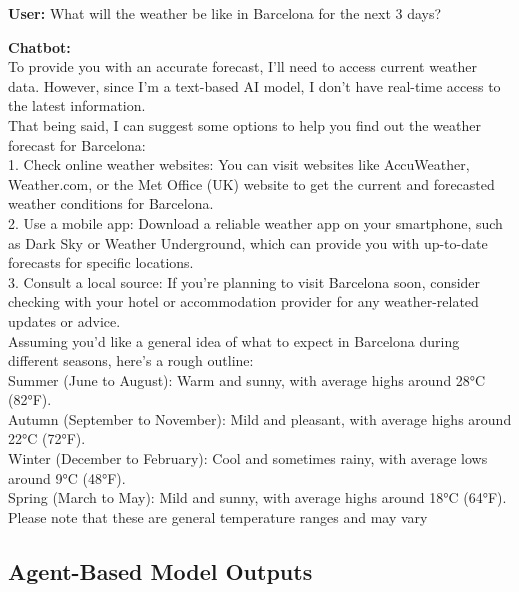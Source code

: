 \documentclass[fleqn,moreauthors,10pt]{ds_report}
\begin{document}
\begin{tcolorbox}[
    colback=gray!5,
    colframe=black!80,
    title=Prompt-Engineered Model Output - Weather,
    arc=2mm
]

\textbf{User:} What will the weather be like in Barcelona for the next 3 days?

\vspace{0.3cm}

\textbf{Chatbot:} \\
To provide you with an accurate forecast, I'll need to access current weather data. However, since I'm a text-based AI model, I don't have real-time access to the latest information.\\

That being said, I can suggest some options to help you find out the weather forecast for Barcelona:\\

1. Check online weather websites: You can visit websites like AccuWeather, Weather.com, or the Met Office (UK) website to get the current and forecasted weather conditions for Barcelona.\\
2. Use a mobile app: Download a reliable weather app on your smartphone, such as Dark Sky or Weather Underground, which can provide you with up-to-date forecasts for specific locations.\\
3. Consult a local source: If you're planning to visit Barcelona soon, consider checking with your hotel or accommodation provider for any weather-related updates or advice.\\

Assuming you'd like a general idea of what to expect in Barcelona during different seasons, here's a rough outline:\\

Summer (June to August): Warm and sunny, with average highs around 28°C (82°F).\\
Autumn (September to November): Mild and pleasant, with average highs around 22°C (72°F).\\
Winter (December to February): Cool and sometimes rainy, with average lows around 9°C (48°F).\\
Spring (March to May): Mild and sunny, with average highs around 18°C (64°F).\\

Please note that these are general temperature ranges and may vary
\end{tcolorbox}

\subsection*{Agent-Based Model Outputs}
\end{document}
